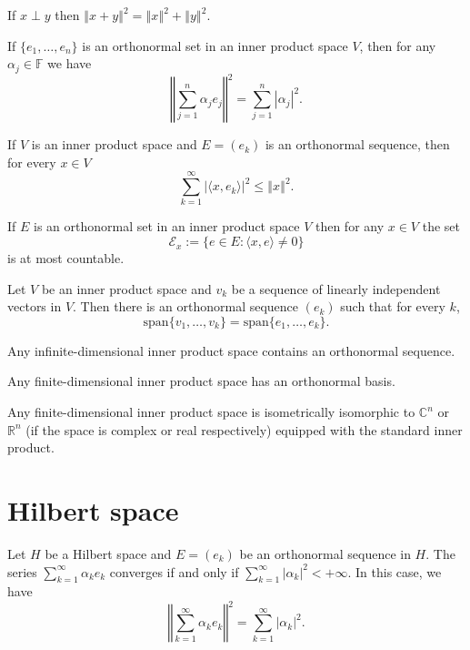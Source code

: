\documentclass[a4paper]{article}
\newcommand{\F}{\mathbb{F}}
\newcommand{\R}{\mathbb{R}}
\newcommand{\C}{\mathbb{C}}
\newcommand{\norm}[1]{\left\Vert #1 \right\Vert}
\newcommand{\<}{\langle}
\renewcommand{\>}{\rangle}
\renewcommand{\a}{\alpha}
\renewcommand{\span}{\mathrm{span}}
\begin{document}
\begin{thm}[Pythagoras]
  If $x\perp y$ then $\norm{x+y}^2 = \norm{x}^2 + \norm{y}^2$.
\end{thm}

\begin{lemma}
  If $\{e_1,\ldots,e_n\}$ is an orthonormal set in an inner product space $V$, then for any $\a_j\in\F$ we have
  $$\norm{\sum_{j=1}^n\a_j e_j}^2 = \sum_{j=1}^n|\a_j|^2.$$
\end{lemma}

\begin{lemma}
  If $V$ is an inner product space and $E=(e_k)$ is an orthonormal sequence, then for every $x\in V$
  $$\sum_{k=1}^\infty|\<x,e_k\>|^2\leq\norm{x}^2.$$
\end{lemma}

\begin{prop}
  If $E$ is an orthonormal set in an inner product space $V$ then for any $x\in V$ the set
  $$\mathcal{E}_x := \{e\in E: \<x,e\>\neq0\}$$
  is at most countable.
\end{prop}

\begin{lemma}
  Let $V$ be an inner product space and $v_k$ be a sequence of linearly independent vectors in $V$. Then there is an orthonormal sequence $(e_k)$ such that for every $k$,
  $$\span\{v_1,\ldots,v_k\} = \span\{e_1,\ldots,e_k\}.$$
\end{lemma}

\begin{prop}
  Any infinite-dimensional inner product space contains an orthonormal sequence.
\end{prop}

\begin{prop}
  Any finite-dimensional inner product space has an orthonormal basis.
\end{prop}

\begin{prop}
  Any finite-dimensional inner product space is isometrically isomorphic to $\C^n$ or $\R^n$ (if the space is complex or real respectively) equipped with the standard inner product.
\end{prop}

\section{Hilbert space}

\begin{lemma}
  Let $H$ be a Hilbert space and $E=(e_k)$ be an orthonormal sequence in $H$. The series $\sum_{k=1}^\infty \a_k e_k$ converges if and only if $\sum_{k=1}^\infty |\a_k|^2 < +\infty$. In this case, we have
  $$\norm{\sum_{k=1}^\infty \a_k e_k}^2 = \sum_{k=1}^\infty|\a_k|^2.$$
\end{lemma}
\end{document}

